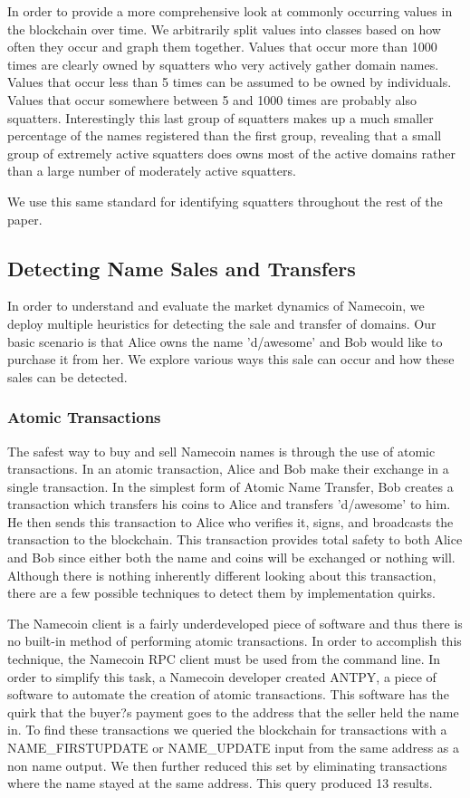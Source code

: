 In order to provide a more comprehensive look at commonly occurring values in the blockchain over time. We arbitrarily split values into classes based on how often they occur and graph them together. Values that occur more than 1000 times are clearly owned by squatters who very actively gather domain names. Values that occur less than 5 times can be assumed to be owned by individuals. Values that occur somewhere between 5 and 1000 times are probably also squatters. Interestingly this last group of squatters makes up a much smaller percentage of the names registered than the first group, revealing that a small group of extremely active squatters does owns most of the active domains rather than a large number of moderately active squatters.

We use this same standard for identifying squatters throughout the rest of the paper.

\subsection{Detecting Name Sales and Transfers}

In order to understand and evaluate the market dynamics of Namecoin, we deploy multiple heuristics for detecting the sale and transfer of domains. Our basic scenario is that Alice owns the name 'd/awesome' and Bob would like to purchase it from her. We explore various ways this sale can occur and how these sales can be detected.

\subsubsection{Atomic Transactions}

The safest way to buy and sell Namecoin names is through the use of atomic transactions. In an atomic transaction, Alice and Bob make their exchange in a single transaction. In the simplest form of Atomic Name Transfer, Bob creates a transaction which transfers his coins to Alice and transfers 'd/awesome' to him. He then sends this transaction to Alice who verifies it, signs, and broadcasts the transaction to the blockchain. This transaction provides total safety to both Alice and Bob since either both the name and coins will be exchanged or nothing will. Although there is nothing inherently different looking about this transaction, there are a few possible techniques to detect them by implementation quirks.

The Namecoin client is a fairly underdeveloped piece of software and thus there is no built-in method of performing atomic transactions. In order to accomplish this technique, the Namecoin RPC client must be used from the command line. In order to simplify this task, a Namecoin developer created ANTPY, a piece of software to automate the creation of atomic transactions. This software has the quirk that the buyer?s payment goes to the address that the seller held the name in. To find these transactions we queried the blockchain for transactions with a NAME\_FIRSTUPDATE or NAME\_UPDATE input from the same address as a non name output. We then further reduced this set by eliminating transactions where the name stayed at the same address. This query produced 13 results.

